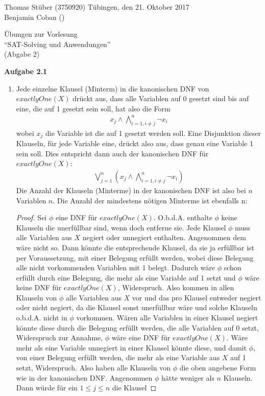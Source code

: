 \documentclass[a4paper,10pt]{article}
\title{}
\author{}
\begin{document}
\noindent Thomas Stüber (3750920) \hfill Tübingen, den  21. Oktober 2017\\
\noindent Benjamin Coban () \\
\begin{center}
\Large Übungen zur Vorlesung  \\ ``SAT-Solving und Anwendungen'' \\
\vspace*{2mm}
\large (Abgabe 2) \\
\vspace*{2mm}
\end{center}

\noindent\textbf{Aufgabe 2.1}\\
\begin{enumerate}
\item Jede einzelne Klausel (Minterm) in die kanonischen DNF von $exactlyOne(X)$ drückt aus, dass alle Variablen auf 0 gesetzt sind bis auf eine, die auf 1 gesetzt sein soll, hat also die Form 
\begin{align*}
x_j \wedge \bigwedge_{i=1, i \neq j}^n \neg x_i 
\end{align*}
wobei $x_j$ die Variable ist die auf 1 gesetzt werden soll. Eine Disjunktion dieser Klauseln, für jede Variable eine, drückt also aus, dass genau eine Variable 1 sein soll. Dies entspricht dann auch der kanonischen DNF für $exactlyOne(X)$:
\begin{align*}
\bigvee_{j=1}^n \left( x_j \wedge \bigwedge_{i=1, i \neq j}^n \neg x_i \right)
\end{align*}
Die Anzahl der Klauseln (Minterme) in der kanonischen DNF ist also bei $n$ Variablen $n$. Die Anzahl der mindestens nötigen Minterme ist ebenfalls n:
\begin{proof}
Sei $\phi$ eine DNF für $exactlyOne(X)$. O.b.d.A. enthalte $\phi$ keine Klauseln die unerfüllbar sind, wenn doch entferne sie. Jede Klausel $\phi$ muss alle Variablen aus $X$ negiert oder unnegiert enthalten. Angenommen dem wäre nicht so. Dann könnte die entsprechende Klausel, da sie ja erfüllbar ist per Voraussetzung, mit einer Belegung erfüllt werden, wobei diese Belegung alle nicht vorkommenden Variablen mit 1 belegt. Dadurch wäre $\phi$ schon erfüllt durch eine Belegung, die mehr als eine Variable auf 1 setzt und $\phi$ wäre keine DNF für $exactlyOne(X)$, Widerspruch. Also kommen in allen Klauseln von $\phi$ alle Variablen aus $X$ vor und das pro Klausel entweder negiert oder nicht negiert, da die Klausel sonst unerfüllbar wäre und solche Klauseln o.b.d.A. nicht in $\phi$ vorkommen. Wären alle Variablen in einer Klausel negiert könnte diese durch die Belegung erfüllt werden, die alle Variablen auf 0 setzt, Widerspruch zur Annahme, $\phi$ wäre eine DNF für $exactlyOne(X)$. Wäre mehr als eine Variable unnegiert in einer Klausel könnte diese, und damit $\phi$, von einer Belegung erfüllt werden, die mehr als eine Variable aus $X$ auf 1 setzt, Widerspruch. Also haben alle Klauseln von $\phi$ die oben angebene Form wie in der kanonischen DNF. Angenommen $\phi$ hätte weniger als $n$ Klauseln. Dann würde für ein $1 \leq j \leq n$ die Klausel 

\end{proof}
\end{enumerate}
\end{document}
